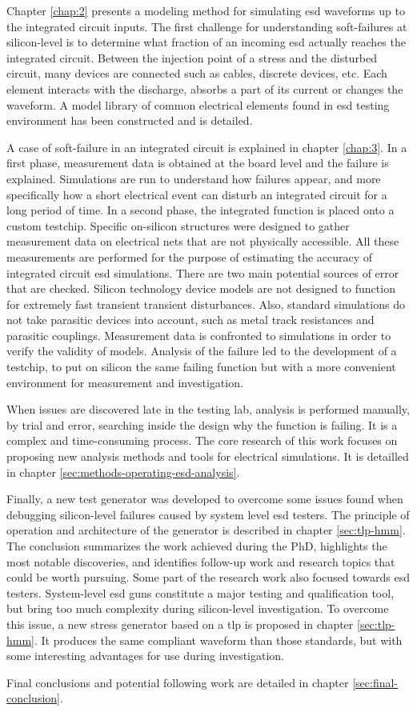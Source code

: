 %
Chapter \ref{chap:2} presents a modeling method for simulating \gls{esd} waveforms up to the integrated circuit inputs.
The first challenge for understanding soft-failures at silicon-level is to determine what fraction of an incoming \gls{esd} actually reaches the integrated circuit.
Between the injection point of a stress and the disturbed circuit, many devices are connected such as cables, discrete devices, etc.
Each element interacts with the discharge, absorbs a part of its current or changes the waveform.
A model library of common electrical elements found in \gls{esd} testing environment has been constructed and is detailed.

%
A case of soft-failure in an integrated circuit is explained in chapter \ref{chap:3}.
In a first phase, measurement data is obtained at the board level and the failure is explained.
Simulations are run to understand how failures appear, and more specifically how a short electrical event can disturb an integrated circuit for a long period of time.
In a second phase, the integrated function is placed onto a custom testchip.
Specific on-silicon structures were designed to gather measurement data on electrical nets that are not physically accessible.
All these measurements are performed for the purpose of estimating the accuracy of integrated circuit \gls{esd} simulations.
There are two main potential sources of error that are checked.
Silicon technology device models are not designed to function for extremely fast transient transient disturbances.
Also, standard simulations do not take parasitic devices into account, such as metal track resistances and parasitic couplings.
Measurement data is confronted to simulations in order to verify the validity of models.
Analysis of the failure led to the development of a testchip, to put on silicon the same failing function but with a more convenient environment for measurement and investigation.

%
When issues are discovered late in the testing lab, analysis is performed manually, by trial and error, searching inside the design why the function is failing.
It is a complex and time-consuming process.
The core research of this work focuses on proposing new analysis methods and tools for electrical simulations.
It is detailled in chapter \ref{sec:methods-operating-esd-analysis}.

%
Finally, a new test generator was developed to overcome some issues found when debugging silicon-level failures caused by system level \gls{esd} testers.
The principle of operation and architecture of the generator is described in chapter \ref{sec:tlp-hmm}.
The conclusion summarizes the work achieved during the PhD, highlights the most notable discoveries, and identifies follow-up work and research topics that could be worth pursuing.
Some part of the research work also focused towards \gls{esd} testers.
System-level \gls{esd} guns \cite{iec61000-4-2, iso10605} constitute a major testing and qualification tool, but bring too much complexity during silicon-level investigation.
To overcome this issue, a new stress generator based on a \gls{tlp} is proposed in chapter \ref{sec:tlp-hmm}.
It produces the same compliant waveform than those standards, but with some interesting advantages for use during investigation.

%
Final conclusions and potential following work are detailed in chapter \ref{sec:final-conclusion}.
